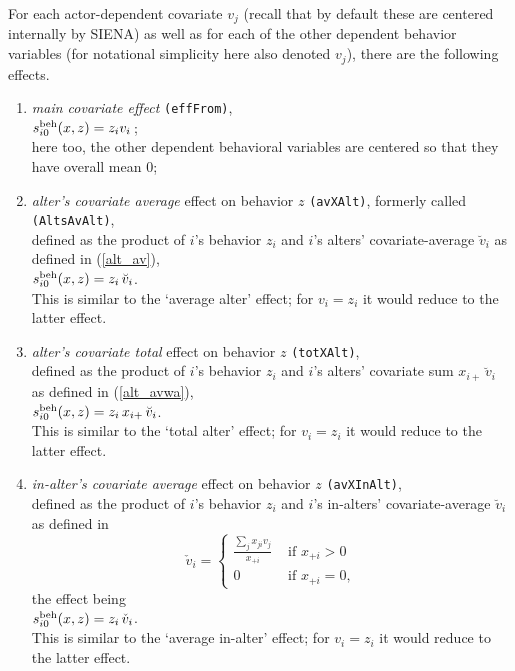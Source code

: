 \documentclass[a4paper,fleqn,11pt]{article}
\newcommand{\+}{\, + \,}
\newcommand{\si}{{\sf SIENA}}
\newcommand{\vit}{\theenumi}
\newcounter{savenumi}
\begin{document}
\noindent
For each actor-dependent covariate $v_j$ (recall that by default these are
centered internally by \si) as well as for each of the other
dependent behavior variables (for notational simplicity here also
denoted $v_j$), there are the following effects.
\begin{enumerate}
\setcounter{enumi}{\value{savenumi}}
 \item {\em main covariate effect} \texttt{(effFrom)},\\
 $s^{\rm beh}_{i\vit}(x, z) = z_{i} v_{i}\,$;\\
 here too, the other dependent behavioral variables are centered so that they
 have overall mean 0;

\item \emph{alter's covariate average } effect on behavior $z$
 \texttt{(avXAlt)}, formerly called \texttt{(AltsAvAlt)},\\
      defined as the product of $i$'s behavior $z_i$ and
      $i$'s alters' covariate-average $\breve v_i$ as defined
      in (\ref{alt_av}),\\
       $s^{\rm beh}_{i\vit}(x, z) = z_i \, \breve v_i $.\\
      This is similar to the `average alter' effect; for
      $v_i = z_i$ it would reduce to the latter effect.

\item \emph{alter's covariate total } effect on behavior $z$
 \texttt{(totXAlt)},\\
      defined as the product of $i$'s behavior $z_i$ and
      $i$'s alters' covariate sum $x_{i+}\,\breve v_i$ as defined
      in (\ref{alt_avwa}),\\
       $s^{\rm beh}_{i\vit}(x, z) = z_i \, x_{i+}\, \breve v_i $.\\
      This is similar to the `total alter' effect; for
      $v_i = z_i$ it would reduce to the latter effect.

\item \emph{in-alter's covariate average } effect on behavior $z$
 \texttt{(avXInAlt)},\\
      defined as the product of $i$'s behavior $z_i$ and
      $i$'s in-alters' covariate-average $\breve v_i$ as defined
      in
\begin{equation}
  \check v_i = \left\{\begin{array}{ll} \displaystyle
         \frac{\sum_j x_{ji}v_j}{x_{+i}}  &  \text{ if } x_{+i} > 0     \\
         0                                &  \text{ if } x_{+i} = 0  ,
  \end{array}   \right.            \label{inalt_av}
\end{equation}
      the effect being \\
       $s^{\rm beh}_{i\vit}(x, z) = z_i \, \check v_i $.\\
      This is similar to the `average in-alter' effect; for
      $v_i = z_i$ it would reduce to the latter effect.


\end{enumerate}
\end{document}
